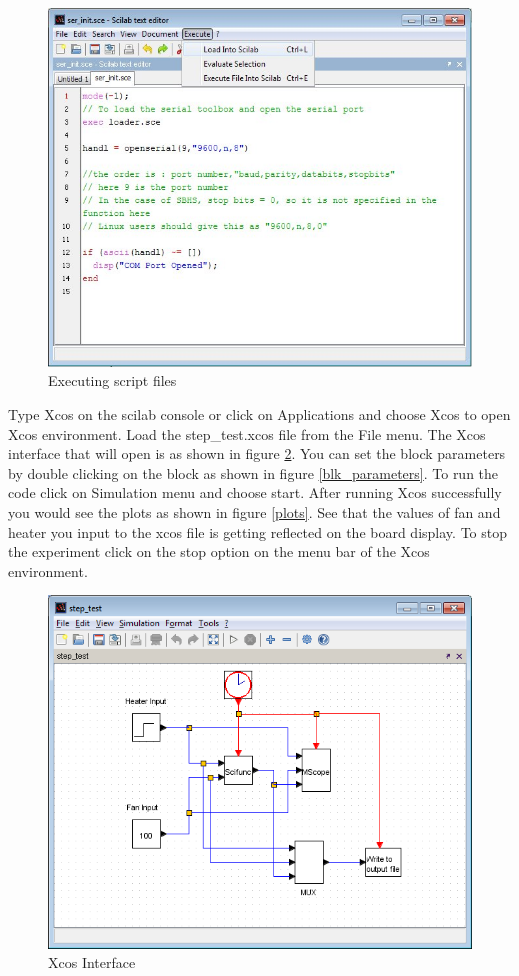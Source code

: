 \begin{figure}
\centering
\includegraphics[width=0.7\linewidth]{using-sbhs/scilab1.jpg}
\caption{Executing script files}
\label{exec}
\end{figure}


Type {\ttfamily Xcos} on the scilab console or click on Applications and choose {\ttfamily Xcos} to open Xcos environment. Load the {\ttfamily step\_test.xcos} file from the File menu. The Xcos interface that will open is as shown in figure \ref{Xcosintr}. You can set the block parameters by double clicking on the block as shown in figure \ref{blk_parameters}. To run the code click on Simulation menu and choose start. After running Xcos successfully you would see the plots as shown in figure \ref{plots}. See that the values of fan and heater you input to the xcos file is getting reflected on the board display. To stop the experiment click on the {\ttfamily stop} option on the menu bar of the Xcos environment.
\begin{figure}
\centering
\includegraphics[width=0.7\linewidth]{using-sbhs/xcos.png}
\caption{Xcos Interface}
\label{Xcosintr}
\end{figure}

